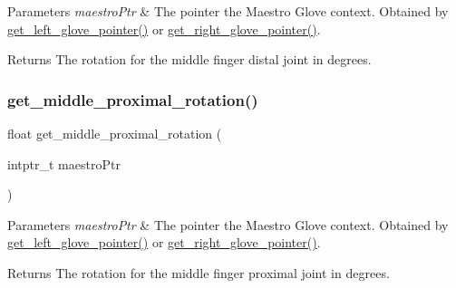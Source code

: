 \begin{DoxyParams}{Parameters}
{\em maestro\+Ptr} & The pointer the Maestro Glove context. Obtained by \hyperlink{group__glove_management_ga63ce3c99d4a8b8db851b22af9185764e}{get\+\_\+left\+\_\+glove\+\_\+pointer()} or \hyperlink{group__glove_management_ga9b8fd9d91aeac3f8da50f7a7eba0c32b}{get\+\_\+right\+\_\+glove\+\_\+pointer()}. \\
\hline
\end{DoxyParams}
\begin{DoxyReturn}{Returns}
The rotation for the middle finger distal joint in degrees. 
\end{DoxyReturn}
\mbox{\label{group__rotation_access_gab9cbb79e5f1b47bd20c079d636b825f0}} 
\subsubsection{\texorpdfstring{get\+\_\+middle\+\_\+proximal\+\_\+rotation()}{get\_middle\_proximal\_rotation()}}
{\footnotesize\ttfamily float get\+\_\+middle\+\_\+proximal\+\_\+rotation (\begin{DoxyParamCaption}\item[{intptr\+\_\+t}]{maestro\+Ptr }\end{DoxyParamCaption})}


\begin{DoxyParams}{Parameters}
{\em maestro\+Ptr} & The pointer the Maestro Glove context. Obtained by \hyperlink{group__glove_management_ga63ce3c99d4a8b8db851b22af9185764e}{get\+\_\+left\+\_\+glove\+\_\+pointer()} or \hyperlink{group__glove_management_ga9b8fd9d91aeac3f8da50f7a7eba0c32b}{get\+\_\+right\+\_\+glove\+\_\+pointer()}. \\
\hline
\end{DoxyParams}
\begin{DoxyReturn}{Returns}
The rotation for the middle finger proximal joint in degrees. 
\end{DoxyReturn}
\mbox{\label{group__rotation_access_gaf8bed7222cb6414313c279237f4233d7}} 
